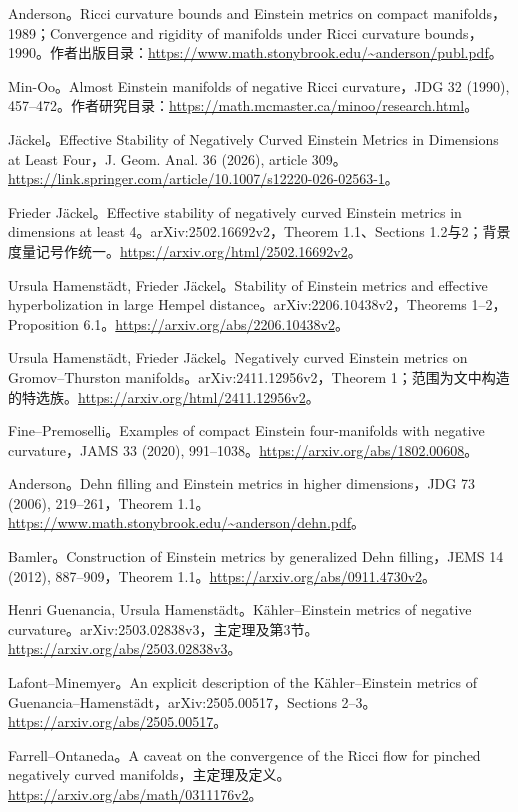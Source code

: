 \documentclass[11pt,a4paper]{article}
\theoremstyle{definition}
\begin{document}
\begin{enumerate}[label={[\arabic*]},leftmargin=2.2em,itemsep=0.55em]
\item Anderson。Ricci curvature bounds and Einstein metrics on compact manifolds，1989；Convergence and rigidity of manifolds under Ricci curvature bounds，1990。作者出版目录：\url{https://www.math.stonybrook.edu/~anderson/publ.pdf}。
\item Min-Oo。Almost Einstein manifolds of negative Ricci curvature，JDG 32 (1990), 457--472。作者研究目录：\url{https://math.mcmaster.ca/minoo/research.html}。
\item Jäckel。Effective Stability of Negatively Curved Einstein Metrics in Dimensions at Least Four，J. Geom. Anal. 36 (2026), article 309。\url{https://link.springer.com/article/10.1007/s12220-026-02563-1}。
\item Frieder Jäckel。Effective stability of negatively curved Einstein metrics in dimensions at least 4。arXiv:2502.16692v2，Theorem 1.1、Sections 1.2与2；背景度量记号作统一。\url{https://arxiv.org/html/2502.16692v2}。
\item Ursula Hamenstädt, Frieder Jäckel。Stability of Einstein metrics and effective hyperbolization in large Hempel distance。arXiv:2206.10438v2，Theorems 1--2，Proposition 6.1。\url{https://arxiv.org/abs/2206.10438v2}。
\item Ursula Hamenstädt, Frieder Jäckel。Negatively curved Einstein metrics on Gromov--Thurston manifolds。arXiv:2411.12956v2，Theorem 1；范围为文中构造的特选族。\url{https://arxiv.org/html/2411.12956v2}。
\item Fine--Premoselli。Examples of compact Einstein four-manifolds with negative curvature，JAMS 33 (2020), 991--1038。\url{https://arxiv.org/abs/1802.00608}。
\item Anderson。Dehn filling and Einstein metrics in higher dimensions，JDG 73 (2006), 219--261，Theorem 1.1。\url{https://www.math.stonybrook.edu/~anderson/dehn.pdf}。
\item Bamler。Construction of Einstein metrics by generalized Dehn filling，JEMS 14 (2012), 887--909，Theorem 1.1。\url{https://arxiv.org/abs/0911.4730v2}。
\item Henri Guenancia, Ursula Hamenstädt。Kähler--Einstein metrics of negative curvature。arXiv:2503.02838v3，主定理及第3节。\url{https://arxiv.org/abs/2503.02838v3}。
\item Lafont--Minemyer。An explicit description of the Kähler--Einstein metrics of Guenancia--Hamenstädt，arXiv:2505.00517，Sections 2--3。\url{https://arxiv.org/abs/2505.00517}。
\item Farrell--Ontaneda。A caveat on the convergence of the Ricci flow for pinched negatively curved manifolds，主定理及定义。\url{https://arxiv.org/abs/math/0311176v2}。

\end{enumerate}
\end{document}
